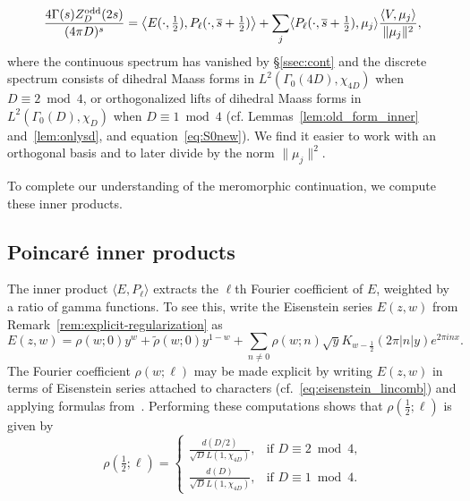 \documentclass[11pt,reqno,oneside]{amsart}
\theoremstyle{plain}
\theoremstyle{definition}
\newcommand{\Zodd}{Z_D^{\textup{odd}}}
\newcommand{\chid}{\chi_{4D}}
\begin{document}
\begin{equation}\label{eq:no_cont}
  \frac{4 \Gamma(s) \Zodd(2s)}{(4\pi D)^s}
  =
  \bigl\langle E(\cdot, \tfrac{1}{2}), P_\ell(\cdot, \overline{s}+\tfrac{1}{2}) \bigr\rangle
  +
  \sum_j \langle P_\ell(\cdot, \overline{s}+\tfrac{1}{2}), \mu_j \rangle
  \frac{\langle V, \mu_j \rangle}{\lVert \mu_j \rVert^2},
\end{equation}
where the continuous spectrum has vanished by \S\ref{ssec:cont} and the
discrete spectrum consists of dihedral Maass forms in $L^2(\Gamma_0(4D),
  \chid)$ when $D \equiv 2 \bmod 4$, or orthogonalized
lifts of dihedral Maass forms in $L^2(\Gamma_0(D), \chi_D)$ when $D \equiv 1
  \bmod 4$ (cf. Lemmas~\ref{lem:old_form_inner} and~\ref{lem:onlysd}, and
equation~\eqref{eq:S0new}).
We find it easier to work with an orthogonal basis and to later divide by the
norm $\lVert \mu_j \rVert^2$.

To complete our understanding of the meromorphic continuation, we compute these
inner products.


\subsection{Poincar\'e inner products}

The inner product $\langle E, P_\ell \rangle$ extracts the $\ell$th Fourier
coefficient of $E$, weighted by a ratio of gamma functions.
To see this, write the Eisenstein series $E(z, w)$ from Remark~\ref{rem:explicit-regularization} as
\begin{equation}
  E(z, w) = \rho(w; 0) y^w + \widetilde{\rho}(w; 0) y^{1-w}
  +
  \sum_{n \neq 0} \rho(w; n)
  \sqrt{y}
  K_{w - \frac{1}{2}}(2 \pi \lvert n \rvert y)
  e^{2 \pi i n x}.
\end{equation}
The Fourier coefficient $\rho(w;\ell)$ may be made explicit by writing $E(z,w)$ in terms of Eisenstein series attached to characters (cf.~\eqref{eq:eisenstein_lincomb}) and applying formulas from~\cite[Proposition 4.1]{Young}.
Performing these computations shows that $\rho(\tfrac{1}{2}; \ell)$ is given by
\begin{equation} \label{eq: constant term in inner product with Eisenstein series}
  \rho(\tfrac{1}{2};\ell)
  = \begin{cases}
    \frac{d(D/2)}{\sqrt{D} L(1,\chid)}, & \text{if $D \equiv 2 \bmod 4$,} \\
    \frac{d(D)}{\sqrt{D} L(1,\chid)},   & \text{if $D \equiv 1 \bmod 4$.}
  \end{cases}
\end{equation}
\end{document}
